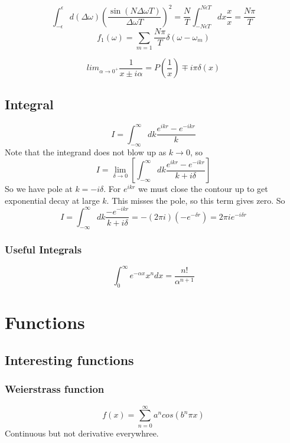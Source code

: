\begin{equation}
    \int_{-\epsilon}^{\epsilon}d(\Delta\omega)\left(\frac{\sin(N\Delta\omega T)}{\Delta\omega T}\right)^2
    =\frac{N}{T}\int_{-N\epsilon T}^{N\epsilon T} dx\frac{x}{x}
    =\frac{N\pi}{T}
\end{equation}
\begin{equation}
    f_1(\omega)=\displaystyle \sum_{m=1}\frac{N\pi}{T}\delta({\omega-\omega_m})
\end{equation}


\begin{equation}
    \displaystyle lim_{\alpha\rightarrow 0^{+}}\frac{1}{x \pm i\alpha} = P\left(\frac{1}{x}\right) \mp i\pi\delta(x)
\end{equation}
\subsection{Integral}
\[
    I=\int_{-\infty}^{\infty}dk\frac{e^{ikr}-e^{-ikr}}{k}
    \]
Note that the integrand does not blow up as $k \rightarrow 0$, so
\[
    I=\displaystyle\lim_{\delta\rightarrow{0}}\left[\int_{-\infty}^{\infty}dk\frac{e^{ikr}-e^{-ikr}}{k+i\delta}\right]
    \]
So we have pole at $k = -i\delta$. For $e^{ikr}$ we must close the contour
up to get exponential decay at large $\mathit{k}$. This misses the pole, so
this term gives zero. So
\[
    I=\int_{-\infty}^{\infty}dk\frac{-e^{-ikr}}{k+i\delta}=-(2\pi{i})(-e^{-\delta{r}})=2\pi{i}e^{-i\delta{r}}
    \]

\subsubsection{Useful Integrals}
\[
    \int_0^\infty e^{-\alpha x}x^ndx = \frac{n!}{\alpha^{n+1}} 
    \]
\section{Functions}

\subsection{Interesting functions}
\subsubsection{Weierstrass function}
\begin{equation}
    f(x) = \sum_{n=0}^{\infty}a^{n}cos(b^{n}\pi x)
\end{equation}
Continuous but not derivative everywhree.


